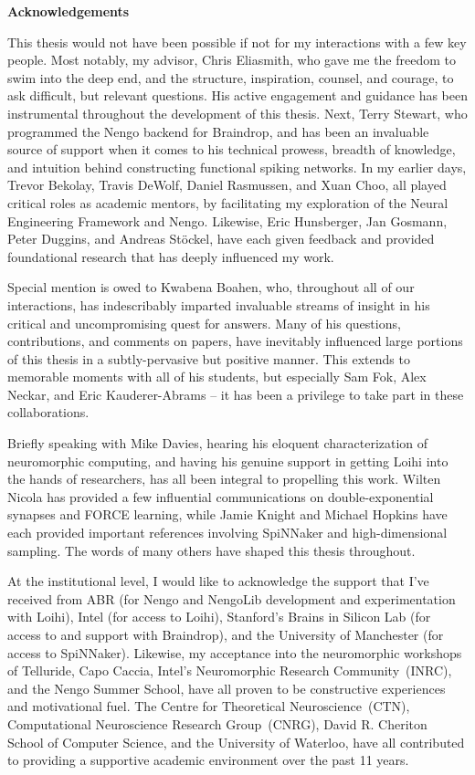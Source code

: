 {}
\begin{center}\textbf{Acknowledgements}\end{center}

\noindent
This thesis would not have been possible if not for my interactions with a few key people.
Most notably, my advisor, Chris Eliasmith, who gave me the freedom to swim into the deep end, and the structure, inspiration, counsel, and courage, to ask difficult, but relevant questions.
His active engagement and guidance has been instrumental throughout the development of this thesis.
Next, Terry Stewart, who programmed the Nengo backend for Braindrop, and has been an invaluable source of support when it comes to his technical prowess, breadth of knowledge, and intuition behind constructing functional spiking networks.
In my earlier days, Trevor Bekolay, Travis DeWolf, Daniel Rasmussen, and Xuan Choo, all played critical roles as academic mentors, by facilitating my exploration of the Neural Engineering Framework and Nengo.
Likewise, Eric Hunsberger, Jan Gosmann, Peter Duggins, and Andreas St{\"o}ckel, have each given feedback and provided foundational research that has deeply influenced my work.

Special mention is owed to Kwabena Boahen, who, throughout all of our interactions, has indescribably imparted invaluable streams of insight in his critical and uncompromising quest for answers.
Many of his questions, contributions, and comments on papers, have inevitably influenced large portions of this thesis in a subtly-pervasive but positive manner.
This extends to memorable moments with all of his students, but especially Sam Fok, Alex Neckar, and Eric Kauderer-Abrams -- it has been a privilege to take part in these collaborations.

Briefly speaking with Mike Davies, hearing his eloquent characterization of neuromorphic computing, and having his genuine support in getting Loihi into the hands of researchers, has all been integral to propelling this work.
Wilten Nicola has provided a few influential communications on double-exponential synapses and FORCE learning, while Jamie Knight and Michael Hopkins have each provided important references involving SpiNNaker and high-dimensional sampling.
The words of many others have shaped this thesis throughout.

At the institutional level, I would like to acknowledge the support that I've received from
ABR (for Nengo and NengoLib development and experimentation with Loihi),
Intel (for access to Loihi),
Stanford's Brains in Silicon Lab (for access to and support with Braindrop),
and the University of Manchester (for access to SpiNNaker).
Likewise, my acceptance into the neuromorphic workshops of Telluride, Capo Caccia, Intel's Neuromorphic Research Community~(INRC), and the Nengo Summer School, have all proven to be constructive experiences and motivational fuel.
The Centre for Theoretical Neuroscience~(CTN), Computational Neuroscience Research Group~(CNRG), David R. Cheriton School of Computer Science, and the University of Waterloo, have all contributed to providing a supportive academic environment over the past 11 years.  

